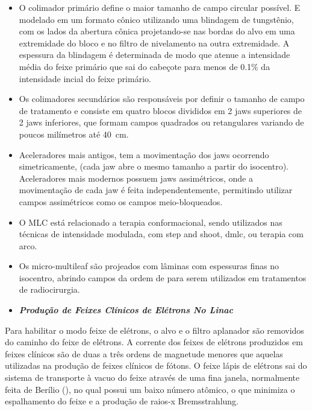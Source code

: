 \documentclass[11pt,a4paper]{article}
\begin{document}
                    \begin{itemize}
                        \item O colimador primário define o maior tamanho de campo circular possível. E modelado em um formato cônico utilizando uma blindagem de tungstênio, com os lados da abertura cônica projetando-se nas bordas do alvo em uma extremidade do bloco e no filtro de nivelamento na outra extremidade. A espessura da blindagem é determinada de modo que atenue a intensidade média do feixe primário que sai do cabeçote para menos de 0.1\% da intensidade incial do feixe primário.
                        
                        \item Os colimadores secundários são responsáveis por definir o tamanho de campo de tratamento e consiste em quatro blocos divididos em 2 jaws superiores de 2 jaws inferiores, que formam campos quadrados ou retangulares variando de poucos milímetros até \qty{40}{cm}.
                        
                        \item Aceleradores mais antigos, tem a movimentação dos jaws ocorrendo simetricamente, (cada jaw abre o mesmo tamanho a partir do isocentro). Aceleradores mais modernos possuem jaws assimétricos, onde a movimentação de cada jaw é feita independentemente, permitindo utilizar campos assimétricos como os campos meio-bloqueados.
                        
                        \item O MLC está relacionado a terapia conformacional, sendo utilizados nas técnicas de intensidade modulada, com step and shoot, dmlc, ou terapia com arco.
                        
                        \item Os micro-multileaf são projeados com lâminas com espessuras finas no isocentro, abrindo campos da ordem de  para serem utilizados em tratamentos de radiocirurgia.
                    \end{itemize}

                \begin{itemize}
                    \item \textbf{\textit{\textcolor{CarnationPink}{Produção de Feixes Clínicos de Elétrons No Linac}}}
                \end{itemize}

                Para habilitar o modo feixe de elétrons, o alvo e o filtro aplanador são removidos do caminho do feixe de elétrons. A corrente dos feixes de elétrons produzidos em feixes clínicos são de duas a três ordens de magnetude menores que aquelas utilizadas na produção de feixes clínicos de fótons. O feixe lápis de elétrons sai do sistema de transporte à vacuo do feixe através de uma fina janela, normalmente feita de Berílio (), no qual possui um baixo número atômico, o que minimiza o espalhamento do feixe e a produção de raios-x Bremsstrahlung.
\end{document}
